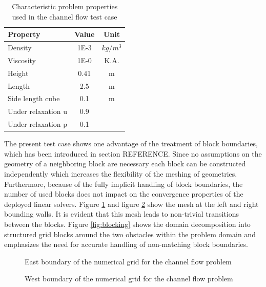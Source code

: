 \begin{table}[h!]\centering
{}
  \begin{tabular}{lcc}\toprule
    Property & Value & Unit \\
    \midrule
    \rowcolor{black!20} Density    & 1E-3 & $kg/m^3$      \\
    \rowcolor{black!00} Viscosity  & 1E-0 & K.A.  \\
    \rowcolor{black!20} Height     & 0.41 & m   \\
    \rowcolor{black!00} Length     & 2.5  & m  \\
    \rowcolor{black!20} Side length cube & 0.1  & m  \\
    \rowcolor{black!00} Under relaxation u & 0.9 &  \\
    \rowcolor{black!20} Under relaxation p & 0.1 &  \\
  \end{tabular}
  \caption{Characteristic problem properties used in the channel flow test case}
  \label{tab:channel}
\end{table}

The present test case shows one advantage of the treatment of block boundaries, which has been introduced in section REFERENCE. Since no assumptions on the geometry of a neighboring block are necessary each block can be constructed independently which increases the flexibility of the meshing of geometries. Furthermore, because of the fully implicit handling of block boundaries, the number of used blocks does not impact on the convergence properties of the deployed linear solvers. Figure \ref{fig:channel1} and figure \ref{fig:channel2} show the mesh at the left and right bounding walls. It is evident that this mesh leads to non-trivial transitions between the blocks. Figure \ref{fig:blocking} shows the domain decomposition into structured grid blocks around the two obstacles within the problem domain and emphasizes the need for accurate handling of non-matching block boundaries.

\begin{figure}
  \centering
  \label{fig:channel1}
  
  \caption{East boundary of the numerical grid for the channel flow problem}
\end{figure}

\begin{figure}
  \centering
  \label{fig:channel2}
  
  \caption{West boundary of the numerical grid for the channel flow problem }
\end{figure}

